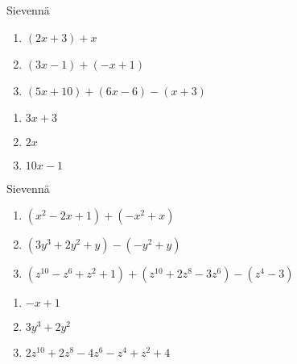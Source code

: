 \begin{tehtava}
    Sievennä
    \begin{enumerate}
        \item $(2x + 3) + x $
        \item $(3x - 1) + (-x + 1)$
        \item $(5x + 10) + (6x - 6) - (x + 3)$
    \end{enumerate}
    \begin{vastaus}
        \begin{enumerate}
            \item $3x + 3$
            \item $2x$
            \item $10x - 1$
        \end{enumerate}
    \end{vastaus}
\end{tehtava}

\begin{tehtava}
    Sievennä
    \begin{enumerate}
        \item $(x^2 - 2x + 1) + (-x^2 + x) $
        \item $(3y^3 + 2y^2  + y) - (-y^2 + y)$
        \item $(z^{10} - z^6 + z^2 + 1) + (z^{10} + 2z^8 - 3z^6) - (z^4 - 3)$
    \end{enumerate}
    \begin{vastaus}
        \begin{enumerate}
            \item $-x + 1$
            \item $3y^3 + 2y^2$
            \item $2z^{10} + 2z^8 - 4z^6 - z^4 + z^2 + 4$
        \end{enumerate}
    \end{vastaus}
\end{tehtava}
